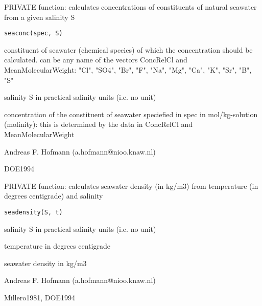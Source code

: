 \documentclass{article}
\begin{document}
\begin{Description}\relax
PRIVATE function: calculates concentrations of constituents of natural seawater from a given salinity S
\end{Description}
\begin{Usage}
\begin{verbatim}seaconc(spec, S)\end{verbatim}
\end{Usage}
\begin{Arguments}
\begin{ldescription}
\item[\code{spec }] constituent of seawater (chemical species) of which the concentration should be calculated. can be any name of the vectors ConcRelCl and MeanMolecularWeight: "Cl", "SO4", "Br", "F", "Na", "Mg", "Ca", "K", "Sr", "B", "S"
\item[\code{S }] salinity S in practical salinity units (i.e. no unit)
\end{ldescription}
\end{Arguments}
\begin{Value}
concentration of the constituent of seawater speciefied in spec in mol/kg-solution (molinity): this is determined by the data in ConcRelCl and MeanMolecularWeight
\end{Value}
\begin{Author}\relax
Andreas F. Hofmann (a.hofmann@nioo.knaw.nl)
\end{Author}
\begin{References}\relax
DOE1994
\end{References}

\begin{Description}\relax
PRIVATE function: calculates seawater density (in kg/m3) from temperature (in degrees centigrade) and salinity
\end{Description}
\begin{Usage}
\begin{verbatim}seadensity(S, t)\end{verbatim}
\end{Usage}
\begin{Arguments}
\begin{ldescription}
\item[\code{S }] salinity S in practical salinity units (i.e. no unit)
\item[\code{t }] temperature in degrees centigrade
\end{ldescription}
\end{Arguments}
\begin{Value}
seawater density in kg/m3
\end{Value}
\begin{Author}\relax
Andreas F. Hofmann (a.hofmann@nioo.knaw.nl)
\end{Author}
\begin{References}\relax
Millero1981, DOE1994
\end{References}
\end{document}
